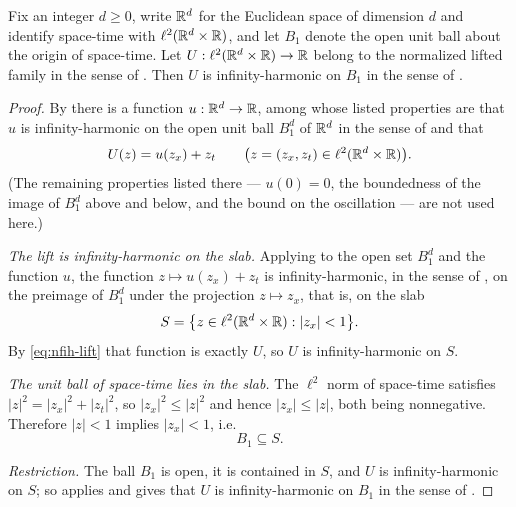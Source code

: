 \begin{lemma}
Fix an integer $d\ge0$, write $\mathbb{R}^d$ for the Euclidean space of dimension $d$ and
identify space-time with $\ell^2(\mathbb{R}^d\times\mathbb{R})$, and let $B_1$ denote the open
unit ball about the origin of space-time. Let
$U:\ell^2(\mathbb{R}^d\times\mathbb{R})\to\mathbb{R}$ belong to the normalized lifted family in the sense
of . Then $U$ is infinity-harmonic on $B_1$ in the
sense of .
\end{lemma}
\begin{proof}
By  there is a function $u:\mathbb{R}^d\to\mathbb{R}$, among whose
listed properties are that $u$ is infinity-harmonic on the open unit ball
$B_1^d$ of $\mathbb{R}^d$ in the sense of  and that
\begin{equation}\label{eq:nfih-lift}
  U(z)=u(z_x)+z_t\qquad\bigl(z=(z_x,z_t)\in\ell^2(\mathbb{R}^d\times\mathbb{R})\bigr).
\end{equation}
(The remaining properties listed there --- $u(0)=0$, the boundedness of the image
of $B_1^d$ above and below, and the bound on the oscillation --- are not used
here.)

\emph{The lift is infinity-harmonic on the slab.} Applying 
to the open set $B_1^d$ and the function $u$, the function
$z\mapsto u(z_x)+z_t$ is infinity-harmonic, in the sense of
, on the preimage of $B_1^d$ under the projection
$z\mapsto z_x$, that is, on the slab
\[
  S=\bigl\{z\in\ell^2(\mathbb{R}^d\times\mathbb{R}):|z_x|<1\bigr\}.
\]
By \eqref{eq:nfih-lift} that function is exactly $U$, so $U$ is
infinity-harmonic on $S$.

\emph{The unit ball of space-time lies in the slab.} The $\ell^2$ norm of
space-time satisfies $|z|^2=|z_x|^2+|z_t|^2$, so $|z_x|^2\le|z|^2$ and hence
$|z_x|\le|z|$, both being nonnegative. Therefore $|z|<1$ implies $|z_x|<1$, i.e.
\[
  B_1\subseteq S .
\]

\emph{Restriction.} The ball $B_1$ is open, it is contained in $S$, and $U$ is
infinity-harmonic on $S$; so  applies and gives that
$U$ is infinity-harmonic on $B_1$ in the sense of .
\end{proof}
